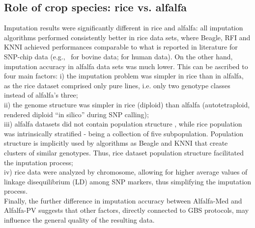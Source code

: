 \subsection{Role of crop species: rice vs. alfalfa}
\label{sec:role_of_species}
Imputation results were significantly different in rice and alfalfa: all imputation algorithms performed consistently better in rice data sets, where Beagle, RFI and KNNI achieved performances comparable to what is reported in literature for SNP-chip data (e.g.,~\cite{vanraden_genomic_2013} for bovine data;
\cite{the_1000_genomes_project_consortium_integrated_2012}
for human data). On the other hand, imputation accuracy in alfalfa data sets was much lower. This can be ascribed to four main factors: 
i) the imputation problem was simpler in rice than in alfalfa, as the rice dataset comprised only pure lines, i.e. only two genotype classes instead of alfalfa's three; \\
ii) the genome structure was simpler in rice (diploid) than alfalfa (autotetraploid, rendered diploid ``in silico'' during SNP calling);\\
iii) alfalfa datasets did not contain population structure \cite{Annicchiarico2015}, while rice population was intrinsically stratified - being a collection of five subpopulation. Population structure is implicitly used by algorithms as Beagle and KNNI that create clusters of similar genotypes. Thus, rice dataset population structure facilitated the inputation process;\\
iv) rice data were analyzed by chromosome, allowing for higher average values of linkage disequilibrium (LD) among SNP markers, thus simplifying the imputation process.\\
Finally, the further difference in imputation accuracy between Alfalfa-Med and Alfalfa-PV suggests that other factors, directly connected to GBS protocols, may influence the general quality of the resulting data.




